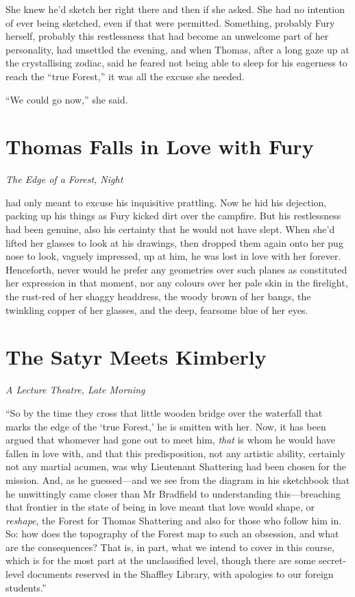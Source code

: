 \documentclass[11pt,a5paper]{article}
\newcommand{\alet}[1]{\textit{#1}\vspace{1em}}
\begin{document}
She knew he'd sketch her right there and then if she asked. She had no intention of ever being sketched, even if that were permitted. Something, probably Fury herself, probably this restlessness that had become an unwelcome part of her personality, had unsettled the evening, and when Thomas, after a long gaze up at the crystallising zodiac, said he feared not being able to sleep for his eagerness to reach the ``true Forest,'' it was all the excuse she needed.

``We could go now,'' she said.

\newpage

\section{Thomas Falls in Love with Fury}

\alet{The Edge of a Forest, Night}

 had only meant to excuse his inquisitive prattling. Now he hid his dejection, packing up his things as Fury kicked dirt over the campfire. But his restlessness had been genuine, also his certainty that he would not have slept. When she'd lifted her glasses to look at his drawings, then dropped them again onto her pug nose to look, vaguely impressed, up at him, he was lost in love with her forever. Henceforth, never would he prefer any geometries over such planes as constituted her expression in that moment, nor any colours over her pale skin in the firelight, the rust-red of her shaggy headdress, the woody brown of her bangs, the twinkling copper of her glasses, and the deep, fearsome blue of her eyes.

\newpage

\section{The Satyr Meets Kimberly}

\alet{A Lecture Theatre, Late Morning}

\noindent ``{\sc So by the time} they cross that little wooden bridge over the waterfall that marks the edge of the `true Forest,' he is smitten with her. Now, it has been argued that whomever had gone out to meet him, \emph{that} is whom he would have fallen in love with, and that this predisposition, not any artistic ability, certainly not any martial acumen, was why Lieutenant Shattering had been chosen for the mission. And, as he guessed---and we see from the diagram in his sketchbook that he unwittingly came closer than Mr Bradfield to understanding this---breaching that frontier in the state of being in love meant that love would shape, or \emph{reshape}, the Forest for Thomas Shattering and also for those who follow him in. So: how does the topography of the Forest map to such an obsession, and what are the consequences? That is, in part, what we intend to cover in this course, which is for the most part at the unclassified level, though there are some secret-level documents reserved in the Shaffley Library, with apologies to our foreign students.''
\end{document}
